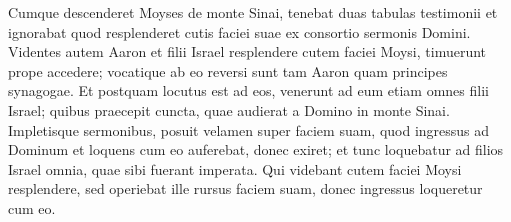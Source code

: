 \begin{biblechapter}
\begin{biblechapter}
\begin{biblechapter}
\begin{biblechapter}
\begin{biblechapter}
\begin{biblechapter}
\begin{biblechapter}
\begin{biblechapter}
\begin{biblechapter}
\begin{biblechapter}
\begin{biblechapter}
\begin{biblechapter}
\begin{biblechapter}
\begin{biblechapter}
\begin{biblechapter}
\begin{biblechapter}
\begin{biblechapter}
\begin{biblechapter}
\begin{biblechapter}
\begin{biblechapter}
\begin{biblechapter}
\begin{biblechapter}
\begin{biblechapter}
\begin{biblechapter}
\begin{biblechapter}
\begin{biblechapter}
\begin{biblechapter}
\begin{biblechapter}
\begin{biblechapter}
\begin{biblechapter}
\begin{biblechapter}
\begin{biblechapter}
\begin{biblechapter}
\begin{biblechapter}
 \verse Cumque descenderet Moyses de monte Sinai, tenebat duas tabulas testimonii et ignorabat quod resplenderet cutis faciei suae ex consortio sermonis Domini. 
 \verse Videntes autem Aaron et filii Israel resplendere cutem faciei Moysi, timuerunt prope accedere; 
\verse vocatique ab eo reversi sunt tam Aaron quam principes synagogae. Et postquam locutus est ad eos, 
\verse venerunt ad eum etiam omnes filii Israel; quibus praecepit cuncta, quae audierat a Domino in monte Sinai.
 \verse Impletisque sermonibus, posuit velamen super faciem suam, 
\verse quod ingressus ad Dominum et loquens cum eo auferebat, donec exiret; et tunc loquebatur ad filios Israel omnia, quae sibi fuerant imperata. 
\verse Qui videbant cutem faciei Moysi resplendere, sed operiebat ille rursus faciem suam, donec ingressus loqueretur cum eo.
 

\end{biblechapter}
\end{biblechapter}
\end{biblechapter}
\end{biblechapter}
\end{biblechapter}
\end{biblechapter}
\end{biblechapter}
\end{biblechapter}
\end{biblechapter}
\end{biblechapter}
\end{biblechapter}
\end{biblechapter}
\end{biblechapter}
\end{biblechapter}
\end{biblechapter}
\end{biblechapter}
\end{biblechapter}
\end{biblechapter}
\end{biblechapter}
\end{biblechapter}
\end{biblechapter}
\end{biblechapter}
\end{biblechapter}
\end{biblechapter}
\end{biblechapter}
\end{biblechapter}
\end{biblechapter}
\end{biblechapter}
\end{biblechapter}
\end{biblechapter}
\end{biblechapter}
\end{biblechapter}
\end{biblechapter}
\end{biblechapter}
